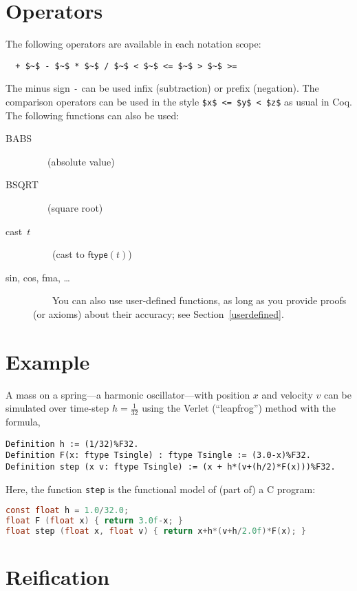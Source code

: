 \documentclass[article]{memoir}
\begin{document}
\chapter{Operators}
\label{operators}\label{models-last}
The following operators are available in each notation scope:
\begin{lstlisting}
  + $~$ - $~$ * $~$ / $~$ < $~$ <= $~$ > $~$ >= 
\end{lstlisting}
The minus sign \lstinline{-} can be used infix (subtraction) or prefix (negation).  The comparison operators can be used in the style
\lstinline{$x$ <= $y$ < $z$} as usual in Coq.
The following functions can also be used:
\begin{description}
\item[\textsf{BABS}]  ~~~(absolute value)
\item[\textsf{BSQRT}]  ~~~(square root)
\item[\textsf{cast~$t$}]  ~~~~(cast to $\mathsf{ftype}(t)$)
\item[sin, cos, fma, \ldots] ~~~~You can also use user-defined functions, as long as you provide proofs (or axioms) about
their accuracy; see Section~\ref{userdefined}.
\end{description}


\chapter{Example}
\label{example}

A mass on a spring---a harmonic oscillator---with position $x$ and
velocity $v$ can be simulated over time-step $h=\frac{1}{32}$ using the
Verlet (``leapfrog'') method with the formula,

\begin{lstlisting}
Definition h := (1/32)%F32.
Definition F(x: ftype Tsingle) : ftype Tsingle := (3.0-x)%F32.  
Definition step (x v: ftype Tsingle) := (x + h*(v+(h/2)*F(x)))%F32.
\end{lstlisting}

Here, the function \lstinline{step} is the functional model of
(part of) a C program:

\begin{lstlisting}[language=C]
const float h = 1.0/32.0;
float F (float x) { return 3.0f-x; }
float step (float x, float v) { return x+h*(v+h/2.0f)*F(x); }
\end{lstlisting}

\chapter{Reification}
\end{document}
